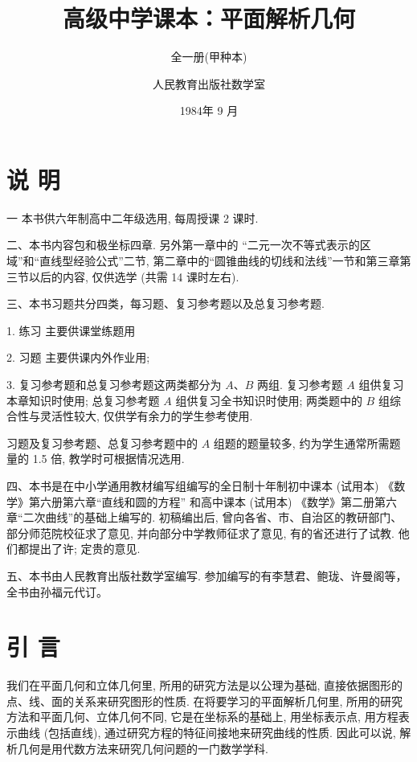 \documentclass[lang=cn,newtx,10.5pt,scheme=chinese]{elegantbook}
\title{高级中学课本：平面解析几何}
\subtitle{全一册(甲种本)}
\author{人民教育出版社数学室}
\institute{人民教育出版社}
\date{1984年 9 月}
\begin{document}
\maketitle

\chapter*{说 明}

  一 本书供六年制高中二年级选用, 每周授课 2 课时.

  二、本书内容包和极坐标四章. 另外第一章中的 “二元一次不等式表示的区域”和“直线型经验公式”二节, 第二章中的“圆锥曲线的切线和法线”一节和第三章第三节以后的内容, 仅供选学 (共需 14 课时左右).

  三、本书习题共分四类，每习题、复习参考题以及总复习参考题.

  1. 练习 主要供课堂练题用

  2. 习题 主要供课内外作业用;

  3. 复习参考题和总复习参考题这两类都分为 \(A\text{、}B\) 两组. 复习参考题 \(A\) 组供复习本章知识时使用; 总复习参考题 \(A\) 组供复习全书知识时使用; 两类题中的 \(B\) 组综合性与灵活性较大, 仅供学有余力的学生参考使用.

  习题及复习参考题、总复习参考题中的 \(A\) 组题的题量较多, 约为学生通常所需题量的 1.5 倍, 教学时可根据情况选用.

  四、本书是在中小学通用教材编写组编写的全日制十年制初中课本 (试用本) 《数学》第六册第六章“直线和圆的方程” 和高中课本 (试用本) 《数学》第二册第六章“二次曲线”的基础上编写的. 初稿编出后, 曾向各省、市、自治区的教研部门、部分师范院校征求了意见, 并向部分中学教师征求了意见, 有的省还进行了试教. 他们都提出了许; 定贵的意见.

  五、本书由人民教育出版社数学室编写. 参加编写的有李慧君、鲍珑、许曼阁等，全书由孙福元代订。
\frontmatter

\tableofcontents

\mainmatter

\chapter*{引 言}

我们在平面几何和立体几何里, 所用的研究方法是以公理为基础, 直接依据图形的点、线、面的关系来研究图形的性质. 在将要学习的平面解析几何里, 所用的研究方法和平面几何、立体几何不同, 它是在坐标系的基础上, 用坐标表示点, 用方程表示曲线 (包括直线), 通过研究方程的特征间接地来研究曲线的性质. 因此可以说, 解析几何是用代数方法来研究几何问题的一门数学学科.
\end{document}
